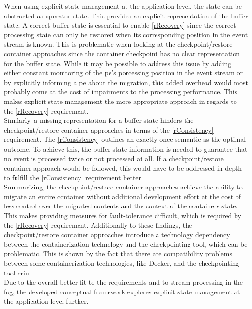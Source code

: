 When using explicit state management at the application level, the state can be abstracted as operator state. This provides an explicit representation of the buffer state. A correct buffer state is essential to enable \ref{rRecovery} since the correct processing state can only be restored when its corresponding position in the event stream is known. This is problematic when looking at the checkpoint/restore container approaches since the container checkpoint has no clear representation for the buffer state. While it may be possible to address this issue by adding either constant monitoring of the \gls{pe}'s porcessing position in the event stream or by explicitly informing a \gls{pe} about the migration, this added overhead would most probably come at the cost of impairments to the processing performance. This makes explicit state management the more appropriate approach in regards to the \ref{rRecovery} requirement.\\
Similarly, a missing representation for a buffer state hinders the checkpoint/restore container approaches in terms of the \ref{rConsistency} requirement. The \ref{rConsistency} outlines an exactly-once semantic as the optimal outcome. To achieve this, the buffer state information is needed to guarantee that no event is processed twice or not processed at all. If a checkpoint/restore container approach would be followed, this would have to be addressed in-depth to fulfill the \ref{rConsistency} requirement better.\\
Summarizing, the checkpoint/restore container approaches achieve the ability to migrate an entire container without additional development effort at the cost of less control over the migrated contents and the context of the containers state. This makes providing measures for fault-tolerance difficult, which is required by the \ref{rRecovery} requirement. Additionally to these findings, the checkpoint/restore container approaches introduce a technology dependency between the containerization technology and the checkpointing tool, which can be problematic. This is shown by the fact that there are compatibility problems between some containerization technologies, like Docker, and the checkpointing tool \gls{criu} \cite{Brogi.2018, .27032020}.\\
Due to the overall better fit to the requirements and to stream processing in the fog, the developed conceptual framework explores explicit state management at the application level further.\par


